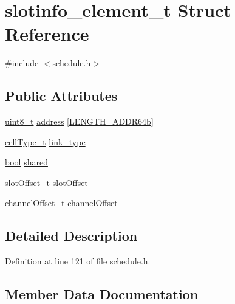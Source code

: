 \hypertarget{structslotinfo__element__t}{}\section{slotinfo\+\_\+element\+\_\+t Struct Reference}
\label{structslotinfo__element__t}


{\ttfamily \#include $<$schedule.\+h$>$}

\subsection*{Public Attributes}
\begin{DoxyCompactItemize}
\item 
\hyperlink{_p_e___types_8h_aba7bc1797add20fe3efdf37ced1182c5}{uint8\+\_\+t} \hyperlink{structslotinfo__element__t_a01ac4d9ef1f8e8c6af4cefe4ae80d81a}{address} \mbox{[}\hyperlink{opendefs_8h_a01c11fde15b63f97f4d6a5962f4551fa}{L\+E\+N\+G\+T\+H\+\_\+\+A\+D\+D\+R64b}\mbox{]}
\item 
\hyperlink{group___schedule_gad8490d4fdf8cef27f7e5fa6a37046a3d}{cell\+Type\+\_\+t} \hyperlink{structslotinfo__element__t_a5f9179c25d2b344bf30cef3f93973c90}{link\+\_\+type}
\item 
\hyperlink{_p_e___types_8h_a97a80ca1602ebf2303258971a2c938e2}{bool} \hyperlink{structslotinfo__element__t_ac2c954062ccd3ca94ba56d5c50034f36}{shared}
\item 
\hyperlink{group___schedule_ga30a663860a70d8c9db2c3a8e66f544fc}{slot\+Offset\+\_\+t} \hyperlink{structslotinfo__element__t_a83230334022a3600203819929c525d4b}{slot\+Offset}
\item 
\hyperlink{group___schedule_gab53645758fe83985f0b35af7c5c2115e}{channel\+Offset\+\_\+t} \hyperlink{structslotinfo__element__t_ad1ae0d951c110b52d0748a46620a0057}{channel\+Offset}
\end{DoxyCompactItemize}


\subsection{Detailed Description}


Definition at line 121 of file schedule.\+h.



\subsection{Member Data Documentation}
